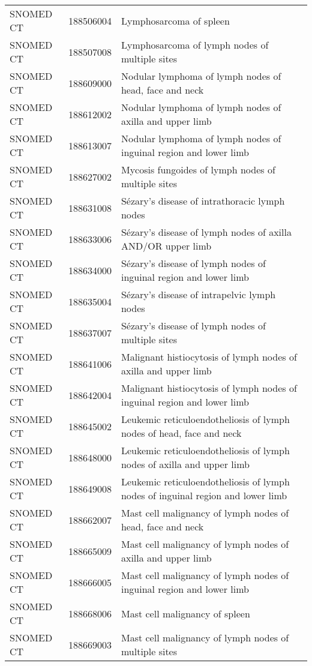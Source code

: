 \begin{longtable}{p{}p{}p{}}
  SNOMED CT & 188506004 & Lymphosarcoma of spleen \\ 
  SNOMED CT & 188507008 & Lymphosarcoma of lymph nodes of multiple sites \\ 
  SNOMED CT & 188609000 & Nodular lymphoma of lymph nodes of head, face and neck \\ 
  SNOMED CT & 188612002 & Nodular lymphoma of lymph nodes of axilla and upper limb \\ 
  SNOMED CT & 188613007 & Nodular lymphoma of lymph nodes of inguinal region and lower limb \\ 
  SNOMED CT & 188627002 & Mycosis fungoides of lymph nodes of multiple sites \\ 
  SNOMED CT & 188631008 & Sézary's disease of intrathoracic lymph nodes \\ 
  SNOMED CT & 188633006 & Sézary's disease of lymph nodes of axilla AND/OR upper limb \\ 
  SNOMED CT & 188634000 & Sézary's disease of lymph nodes of inguinal region and lower limb \\ 
  SNOMED CT & 188635004 & Sézary's disease of intrapelvic lymph nodes \\ 
  SNOMED CT & 188637007 & Sézary's disease of lymph nodes of multiple sites \\ 
  SNOMED CT & 188641006 & Malignant histiocytosis of lymph nodes of axilla and upper limb \\ 
  SNOMED CT & 188642004 & Malignant histiocytosis of lymph nodes of inguinal region and lower limb \\ 
  SNOMED CT & 188645002 & Leukemic reticuloendotheliosis of lymph nodes of head, face and neck \\ 
  SNOMED CT & 188648000 & Leukemic reticuloendotheliosis of lymph nodes of axilla and upper limb \\ 
  SNOMED CT & 188649008 & Leukemic reticuloendotheliosis of lymph nodes of inguinal region and lower limb \\ 
  SNOMED CT & 188662007 & Mast cell malignancy of lymph nodes of head, face and neck \\ 
  SNOMED CT & 188665009 & Mast cell malignancy of lymph nodes of axilla and upper limb \\ 
  SNOMED CT & 188666005 & Mast cell malignancy of lymph nodes of inguinal region and lower limb \\ 
  SNOMED CT & 188668006 & Mast cell malignancy of spleen \\ 
  SNOMED CT & 188669003 & Mast cell malignancy of lymph nodes of multiple sites \\ 

\end{longtable}
